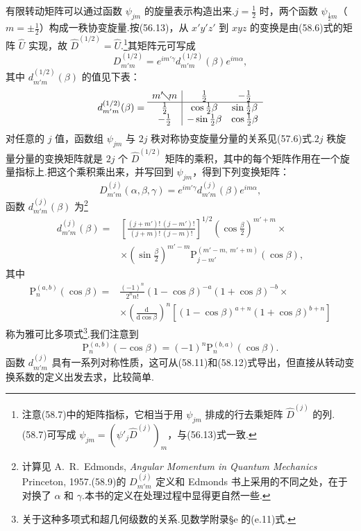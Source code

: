 有限转动矩阵可以通过函数 $\psi_{jm}$ 的旋量表示构造出来.$j=\frac{1}{2}$ 时，两个函数 $\psi_{\frac{1}{2}m}$（$m=\pm\frac{1}{2}$）构成一秩协变旋量.按(56.13)，从 $x'y'z'$ 到 $xyz$ 的变换是由(58.6)式的矩阵 $\hat{U}$ 实现，故 $\hat{D}^{(1/2)}=\hat{U}$.\footnote{注意(58.7)中的矩阵指标，它相当于用 $\psi_{jm}$ 排成的行去乘矩阵 $\hat{D}^{(j)}$ 的列.(58.7)可写成 $\psi_{jm}=(\psi'_j\hat{D}^{(j)})_m$，与(56.13)式一致.}其矩阵元可写成
\begin{equation*}
  D^{(1/2)}_{m'm}=e^{im'\gamma}d^{(1/2)}_{m'm}(\beta)e^{im\alpha},
\end{equation*}
其中 $d^{(1/2)}_{m'm}(\beta)$ 的值见下表：
\begin{equation}
  d^{(1/2)}_{m'm}(\beta)=
  \begin{array}{c|cc}
  m'\!\diagdown\!m & \frac{1}{2} & -\frac{1}{2}\\ \hline
  \frac{1}{2} & \cos\frac{1}{2}\beta & \sin\frac{1}{2}\beta\\
  -\frac{1}{2} & -\sin\frac{1}{2}\beta & \cos\frac{1}{2}\beta
  \end{array}
\end{equation}
对任意的 $j$ 值，函数组 $\psi_{jm}$ 与 $2j$ 秩对称协变旋量分量的关系见(57.6)式.$2j$ 秩旋量分量的变换矩阵就是 $2j$ 个 $\hat{D}^{(1/2)}$ 矩阵的乘积，其中的每个矩阵作用在一个旋量指标上.把这个乘积乘出来，并写回到 $\psi_{jm}$，得到下列变换矩阵：
\begin{equation}
  D^{(j)}_{m'm}(\alpha,\beta,\gamma)
  =e^{im'\gamma}d^{(j)}_{m'm}(\beta)e^{im\alpha},
\end{equation}
函数 $d^{(j)}_{m'm}(\beta)$ 为\footnote{计算见 A.~R.~Edmonds, \textit{Angular Momentum in Quantum Mechanics} Princeton, 1957.(58.9)的 $D^{(j)}_{m'm}$ 定义和 Edmonds 书上采用的不同之处，在于对换了 $\alpha$ 和 $\gamma$.本书的定义在处理过程中显得更自然一些.}
\begin{equation}
\begin{aligned}
  d^{(j)}_{m'm}(\beta)={}&\left[\frac{(j+m')!\,(j-m')!}{(j+m)!\,(j-m)!}\right]^{1/2}
  \left(\cos\frac{\beta}{2}\right)^{m'+m}\times\\
  &\times\left(\sin\frac{\beta}{2}\right)^{m'-m}
  \mathrm{P}^{(m'-m,\ m'+m)}_{j-m'}(\cos\beta),
\end{aligned}
\end{equation}
其中
\begin{equation}
\begin{aligned}
  \mathrm{P}_n^{(a,b)}(\cos\beta)={}&\frac{(-1)^n}{2^n n!}
  (1-\cos\beta)^{-a}(1+\cos\beta)^{-b}\times\\
  &\times\left(\frac{\mathrm{d}}{\mathrm{d}\cos\beta}\right)^{\!n}
  \left[(1-\cos\beta)^{a+n}(1+\cos\beta)^{b+n}\right]
\end{aligned}
\end{equation}
称为雅可比多项式\footnote{关于这种多项式和超几何级数的关系.见数学附录§e 的(e.11)式.}.我们注意到
\begin{equation}
  \mathrm{P}_n^{(a,b)}(-\cos\beta)=(-1)^n\mathrm{P}_n^{(b,a)}(\cos\beta).
\end{equation}
函数 $d^{(j)}_{m'm}$ 具有一系列对称性质，这可从(58.11)和(58.12)式导出，但直接从转动变换系数的定义出发去求，比较简单.

